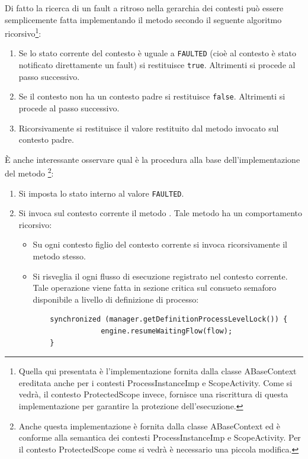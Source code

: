 Di fatto la ricerca di un fault a ritroso nella gerarchia dei contesti può
essere semplicemente fatta implementando il metodo 
secondo il seguente algoritmo ricorsivo\footnote{Quella qui presentata \`e
l'implementazione fornita dalla classe ABaseContext ereditata anche per i
contesti ProcessInstanceImp e ScopeActivity. Come si vedrà, il contesto
ProtectedScope invece, fornisce una riscrittura di questa implementazione per
garantire la protezione dell'esecuzione.}:

\begin{enumerate}
  \item Se lo stato corrente del contesto \`e uguale a \texttt{FAULTED} (cioè
  al contesto \`e stato notificato direttamente un fault) si restituisce
  \texttt{true}. Altrimenti si procede al passo successivo.
  \item Se il contesto non ha un contesto padre si restituisce \texttt{false}.
  Altrimenti si procede al passo successivo.
  \item Ricorsivamente si restituisce il valore restituito dal metodo 
   invocato sul contesto padre.
\end{enumerate}

\`E anche interessante osservare qual è la procedura alla
base dell'implementazione del metodo \footnote{Anche questa implementazione \`e fornita dalla classe ABaseContext ed \`e conforme
alla semantica dei contesti ProcessInstanceImp e ScopeActivity. Per il contesto
ProtectedScope come si vedrà è necessario una piccola modifica.}:

\begin{enumerate}
  \item Si imposta lo stato interno al valore \texttt{FAULTED}.
  \item Si invoca sul contesto corrente il metodo .
  Tale metodo ha un comportamento ricorsivo:
  \begin{itemize}
  	\item  Su ogni contesto figlio del contesto corrente si invoca ricorsivamente
  	il metodo  stesso.
  	\item Si risveglia il ogni flusso di esecuzione registrato nel contesto
  	corrente. Tale operazione viene fatta in sezione critica sul consueto
  	semaforo disponibile a livello di definizione di processo:
	\begin{lstlisting}
	synchronized (manager.getDefinitionProcessLevelLock()) {
                engine.resumeWaitingFlow(flow);
    }
  	\end{lstlisting}	  	 
  \end{itemize}
\end{enumerate}

